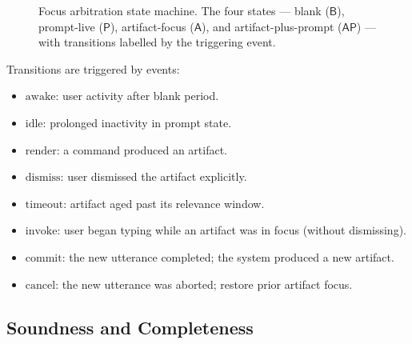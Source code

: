 \documentclass[11pt,a4paper]{article}
\theoremstyle{definition}
\theoremstyle{remark}
\begin{document}
\begin{figure}[t]
\centering
{}
\caption{Focus arbitration state machine. The four states --- blank ($\mathsf{B}$), prompt-live ($\mathsf{P}$), artifact-focus ($\mathsf{A}$), and artifact-plus-prompt ($\mathsf{AP}$) --- with transitions labelled by the triggering event.}
\label{fig:focus-states}
\end{figure}

Transitions are triggered by events:
\begin{itemize}
    \item $\text{awake}$: user activity after blank period.
    \item $\text{idle}$: prolonged inactivity in prompt state.
    \item $\text{render}$: a command produced an artifact.
    \item $\text{dismiss}$: user dismissed the artifact explicitly.
    \item $\text{timeout}$: artifact aged past its relevance window.
    \item $\text{invoke}$: user began typing while an artifact was in focus (without dismissing).
    \item $\text{commit}$: the new utterance completed; the system produced a new artifact.
    \item $\text{cancel}$: the new utterance was aborted; restore prior artifact focus.
\end{itemize}

\subsection{Soundness and Completeness}
\end{document}
